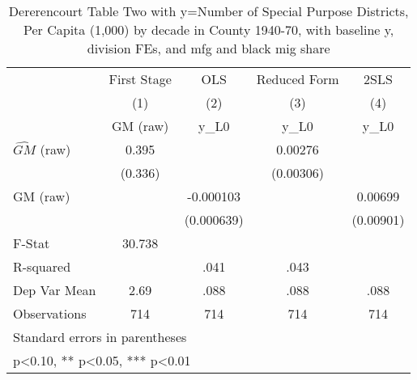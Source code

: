 \begin{table}[htbp]\centering
\def\sym#1{\ifmmode^{#1}\else\(^{#1}\)\fi}
\caption{Dererencourt Table Two with y=Number of Special Purpose Districts, Per Capita (1,000) by decade in County 1940-70, with baseline y, division FEs, and mfg and black mig share}
\begin{tabular}{l*{4}{c}}
\toprule
                    & First Stage   &         OLS   &Reduced Form   &        2SLS   \\
                    &\multicolumn{1}{c}{(1)}&\multicolumn{1}{c}{(2)}&\multicolumn{1}{c}{(3)}&\multicolumn{1}{c}{(4)}\\
                    &\multicolumn{1}{c}{GM  (raw)}&\multicolumn{1}{c}{y\_L0}&\multicolumn{1}{c}{y\_L0}&\multicolumn{1}{c}{y\_L0}\\
\midrule
$\hat{GM}$ (raw)    &       0.395   &               &     0.00276   &               \\
                    &     (0.336)   &               &   (0.00306)   &               \\
\addlinespace
GM  (raw)           &               &   -0.000103   &               &     0.00699   \\
                    &               &  (0.000639)   &               &   (0.00901)   \\
\midrule
F-Stat              &      30.738   &               &               &               \\
R-squared           &               &        .041   &        .043   &               \\
Dep Var Mean        &        2.69   &        .088   &        .088   &        .088   \\
Observations        &         714   &         714   &         714   &         714   \\
\bottomrule
\multicolumn{5}{l}{\footnotesize Standard errors in parentheses}\\
\multicolumn{5}{l}{\footnotesize * p<0.10, ** p<0.05, *** p<0.01}\\
\end{tabular}
\end{table}
